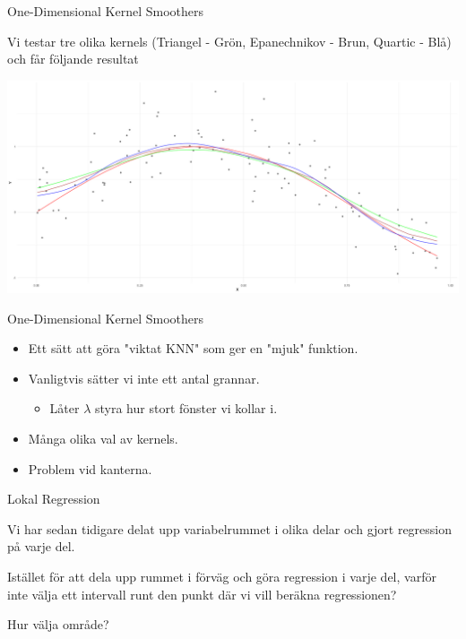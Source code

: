 \documentclass[10pt,english]{beamer}
\begin{document}
\begin{frame}{One-Dimensional Kernel Smoothers}

    Vi testar tre olika kernels (Triangel - Grön, Epanechnikov - Brun, Quartic - Blå) och får följande resultat

    \includegraphics[width = \textwidth]{fig/kernel.png}
    
\end{frame}

\begin{frame}{One-Dimensional Kernel Smoothers}

    \begin{itemize}
        \item Ett sätt att göra "viktat KNN" som ger en "mjuk" funktion.
        \item Vanligtvis sätter vi inte ett antal grannar.
        \begin{itemize}
            \item Låter $\lambda$ styra hur stort fönster vi kollar i.
        \end{itemize}
        \item Många olika val av kernels.
        \item Problem vid kanterna.
    \end{itemize}
    
\end{frame}

\begin{frame}{Lokal Regression}

    Vi har sedan tidigare delat upp variabelrummet i olika delar och gjort regression på varje del.

    Istället för att dela upp rummet i förväg och göra regression i varje del, varför inte välja ett intervall runt den punkt där vi vill beräkna regressionen?

    Hur välja område?
    
\end{frame}
\end{document}
